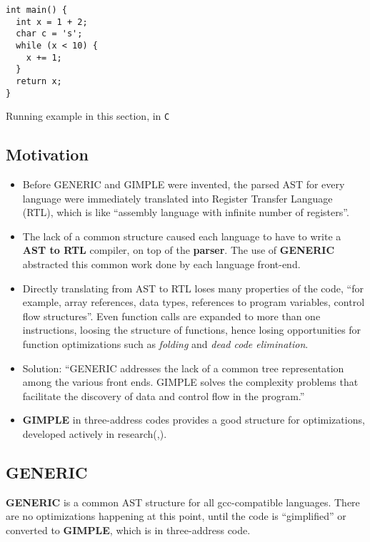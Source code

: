 \documentclass[11pt]{article}
\begin{document}
\begin{listing}[H]
\begin{verbatim}
int main() {
  int x = 1 + 2;
  char c = 's';
  while (x < 10) {
    x += 1;
  }
  return x;
}
\end{verbatim}
\caption{Running example in this section, in \texttt{C}}
\end{listing}
\subsection{Motivation}
\label{sec:org9ebb2ab}
\begin{itemize}
\item Before GENERIC and GIMPLE were invented, the parsed AST for every language
were immediately translated into Register Transfer Language (RTL), which is
like ``assembly language with infinite number of registers''.
  \item The lack of a common structure caused each language to have to write a
        \textbf{AST to RTL} compiler, on top of the \textbf{parser}. The use of
        \textbf{GENERIC} abstracted this common work done by each language
        front-end.
  \item Directly translating from AST to RTL loses many properties of the code,
        ``for example, array references, data types, references to program
        variables, control flow structures''\cite{novillo_2004}. Even function
        calls are expanded to more than one instructions, loosing the structure
        of functions, hence losing opportunities for function optimizations such
        as \emph{folding} and \emph{dead code elimination}.
  \item Solution: ``GENERIC addresses the lack of a common tree representation
        among the various front ends. GIMPLE solves the complexity problems that
        facilitate the discovery of data and control flow in the
        program.''\cite{novillo_2004}
  \item \textbf{GIMPLE} in three-address codes provides a good structure for
        optimizations, developed actively in
        research(\cite{tree-ssa-passes},\cite{rtl-passes}).
\end{itemize}
\subsection{GENERIC}
\label{sec:org0ff633c}
\textbf{GENERIC} is a common AST structure for all gcc-compatible languages.
There are no optimizations happening at this point, until the code is
``gimplified'' or converted to \textbf{GIMPLE}, which is in three-address code.
\end{document}
